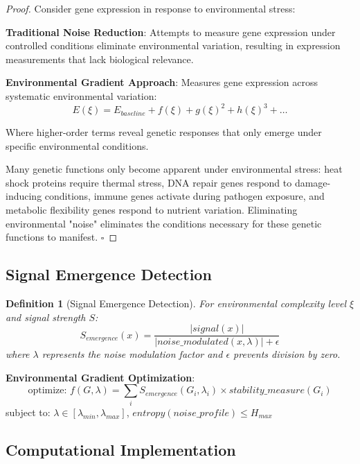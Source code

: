 \documentclass[12pt,a4paper]{article}
\newtheorem{definition}[theorem]{Definition}
\begin{document}
\begin{proof}
Consider gene expression in response to environmental stress:

\textbf{Traditional Noise Reduction}: Attempts to measure gene expression under controlled conditions eliminate environmental variation, resulting in expression measurements that lack biological relevance.

\textbf{Environmental Gradient Approach}: Measures gene expression across systematic environmental variation:
\begin{equation}
E(\xi) = E_{baseline} + f(\xi) + g(\xi)^2 + h(\xi)^3 + \ldots
\end{equation}

Where higher-order terms reveal genetic responses that only emerge under specific environmental conditions.

Many genetic functions only become apparent under environmental stress: heat shock proteins require thermal stress, DNA repair genes respond to damage-inducing conditions, immune genes activate during pathogen exposure, and metabolic flexibility genes respond to nutrient variation. Eliminating environmental "noise" eliminates the conditions necessary for these genetic functions to manifest. $\square$
\end{proof}

\subsection{Signal Emergence Detection}

\begin{definition}[Signal Emergence Detection]
For environmental complexity level $\xi$ and signal strength $S$:
\begin{equation}
S_{emergence}(x) = \frac{|signal(x)|}{|noise\_modulated(x, \lambda)| + \epsilon}
\end{equation}
where $\lambda$ represents the noise modulation factor and $\epsilon$ prevents division by zero.
\end{definition}

\textbf{Environmental Gradient Optimization}:
\begin{equation}
\text{optimize: } f(G, \lambda) = \sum_i S_{emergence}(G_i, \lambda_i) \times stability\_measure(G_i)
\end{equation}
subject to: $\lambda \in [\lambda_{min}, \lambda_{max}]$, $entropy(noise\_profile) \leq H_{max}$

\subsection{Computational Implementation}
\end{document}
